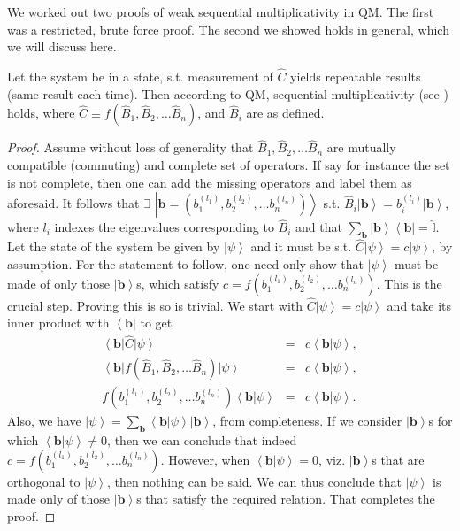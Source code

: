 We worked out two proofs of weak sequential multiplicativity in QM.
The first was a restricted, brute force proof. The second we showed
holds in general, which we will discuss here.
\begin{prop*}
Let the system be in a state, s.t. measurement of $\hat{C}$ yields
repeatable results (same result each time). Then according to QM,
sequential multiplicativity (see )
holds, where $\hat{C}\equiv f(\hat{B}_{1},\hat{B}_{2},\dots\hat{B}_{n})$,
and $\hat{B}_{i}$ are as defined. \end{prop*}
\begin{proof}
Assume without loss of generality that $\hat{B}_{1},\hat{B}_{2},\dots\hat{B}_{n}$
are mutually compatible (commuting) and complete set of operators.
If say for instance the set is not complete, then one can add the
missing operators and label them as aforesaid. It follows that $\exists$
$\left|\mathbf{b}=\left(b_{1}^{(l_{1})},b_{2}^{(l_{2})},\dots b_{n}^{(l_{n})}\right)\right\rangle $
s.t. $\hat{B}_{i}\left|\mathbf{b}\right\rangle =b_{i}^{(l_{i})}\left|\mathbf{b}\right\rangle $,
where $l_{i}$ indexes the eigenvalues corresponding to $\hat{B}_{i}$
and that $\sum_{\mathbf{b}}\left|\mathbf{b}\right\rangle \left\langle \mathbf{b}\right|=\hat{\mathbb{I}}$.
Let the state of the system be given by $\left|\psi\right\rangle $
and it must be s.t. $\hat{C}\left|\psi\right\rangle =c\left|\psi\right\rangle $,
by assumption. For the statement to follow, one need only show that
$\left|\psi\right\rangle $ must be made of only those $\left|\mathbf{b}\right\rangle $s,
which satisfy $c=f(b_{1}^{(l_{1})},b_{2}^{(l_{2})},\dots b_{n}^{(l_{n})})$.
This is the crucial step. Proving this is so is trivial. We start
with $\hat{C}\left|\psi\right\rangle =c\left|\psi\right\rangle $
and take its inner product with $\left\langle \mathbf{b}\right|$
to get 
\begin{eqnarray*}
\left\langle \mathbf{b}\right|\hat{C}\left|\psi\right\rangle  & = & c\left\langle \mathbf{b}|\psi\right\rangle ,\\
\left\langle \mathbf{b}\right|f(\hat{B}_{1},\hat{B}_{2},\dots\hat{B}_{n})\left|\psi\right\rangle  & = & c\left\langle \mathbf{b}|\psi\right\rangle ,\\
f(b_{1}^{(l_{1})},b_{2}^{(l_{2})},\dots b_{n}^{(l_{n})})\left\langle \mathbf{b}|\psi\right\rangle  & = & c\left\langle \mathbf{b}|\psi\right\rangle .
\end{eqnarray*}
Also, we have $\left|\psi\right\rangle =\sum_{\mathbf{b}}\left\langle \mathbf{b}|\psi\right\rangle \left|\mathbf{b}\right\rangle $,
from completeness. If we consider $\left|\mathbf{b}\right\rangle $s
for which $\left\langle \mathbf{b}|\psi\right\rangle \neq0$, then
we can conclude that indeed $c=f(b_{1}^{(l_{1})},b_{2}^{(l_{2})},\dots b_{n}^{(l_{n})})$.
However, when $\left\langle \mathbf{b}|\psi\right\rangle =0$, viz.
$\left|\mathbf{b}\right\rangle $s that are orthogonal to $\left|\psi\right\rangle $,
then nothing can be said. We can thus conclude that $\left|\psi\right\rangle $
is made only of those $\left|\mathbf{b}\right\rangle $s that satisfy
the required relation. That completes the proof.
\end{proof}
